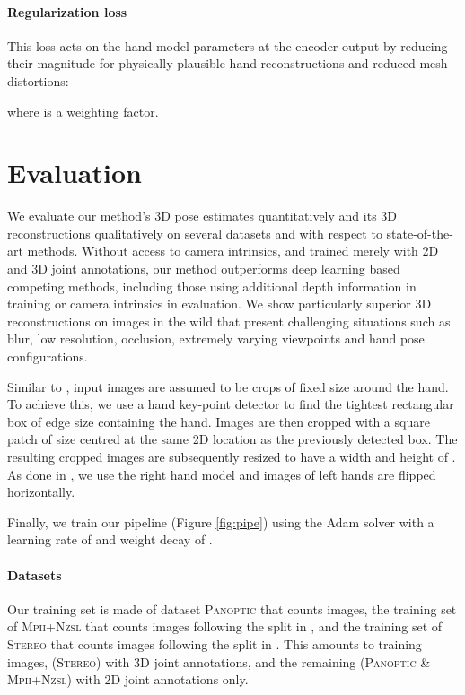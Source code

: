 \documentclass[10pt,twocolumn,letterpaper]{article}
\begin{document}
\paragraph{Regularization loss}
\vspace{-10pt}
This loss acts on the hand model parameters at the encoder output by reducing their magnitude for physically plausible hand reconstructions and reduced mesh distortions: 

where  is a weighting factor.

\section{Evaluation}
\label{sec:eval}

We evaluate our method's 3D pose estimates quantitatively and its 3D reconstructions qualitatively on several datasets and with respect to state-of-the-art methods. Without access to camera intrinsics, and trained merely with 2D and 3D joint annotations, our method outperforms deep learning based competing methods, including those using additional depth information in training or camera intrinsics in evaluation. We show particularly superior 3D reconstructions on images in the wild that present challenging situations such as blur, low resolution, occlusion, extremely varying viewpoints and hand pose configurations.

Similar to \cite{simon2017hand}, input images are assumed to be crops of fixed size around the hand. To achieve this, we use a hand key-point detector \cite{simon2017hand} to find the tightest rectangular box of edge size  containing the hand. Images are then cropped with a square patch of size  centred at the same 2D location as the previously detected box. The resulting cropped images are subsequently resized to have a width and height of . As done in \cite{simon2017hand}, we use the right hand model and images of left hands are flipped horizontally.

Finally, we train our pipeline (Figure \ref{fig:pipe}) using the Adam solver \cite{kingma2014adam} with a learning rate of  and weight decay of .

\paragraph{Datasets}
\vspace{-10pt}
Our training set is made of dataset \textsc{Panoptic} \cite{simon2017hand} that counts  images, the training set of \textsc{Mpii+Nzsl} \cite{simon2017hand} that counts  images following the split in \cite{simon2017hand}, and the training set of \textsc{Stereo} \cite{zhang20163d} that counts  images following the split in \cite{zimmermann2017learning}. This amounts to  training images,  (\textsc{Stereo}) with 3D joint annotations, and the remaining  (\textsc{Panoptic} \& \textsc{Mpii+Nzsl}) with 2D joint annotations only. 
\end{document}
